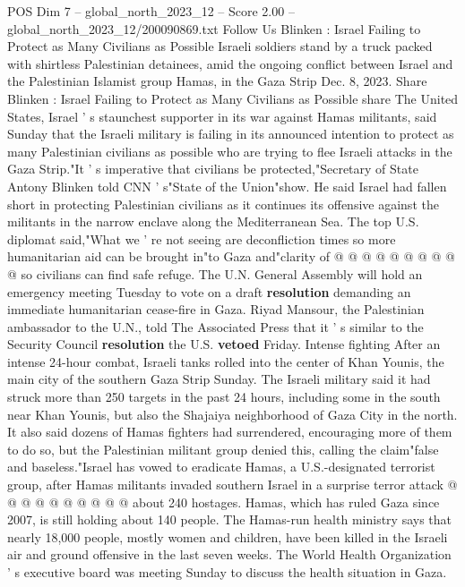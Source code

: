 \begin{textsample}{POS Dim 7 – global\_north\_2023\_12 – Score 2.00 – global\_north\_2023\_12/200090869.txt}  \label{ex:f7_pos_309}
Follow Us Blinken : Israel Failing to Protect as Many Civilians as Possible Israeli soldiers stand by a truck packed with shirtless Palestinian detainees, amid the ongoing conflict between Israel and the Palestinian Islamist group Hamas, in the Gaza Strip Dec. 8, 2023.
Share Blinken : Israel Failing to Protect as Many Civilians as Possible share The United States, Israel ' s staunchest supporter in its war against Hamas militants, said Sunday that the Israeli military is failing in its announced intention to protect as many Palestinian civilians as possible who are trying to flee Israeli attacks in the Gaza Strip."It ' s imperative that civilians be protected,"Secretary of State Antony Blinken told CNN ' s"State of the Union"show.
He said Israel had fallen short in protecting Palestinian civilians as it continues its offensive against the militants in the narrow enclave along the Mediterranean Sea.
The top U.S. diplomat said,"What we ' re not seeing are deconfliction times so more humanitarian aid can be brought in"to Gaza and"clarity of @ @ @ @ @ @ @ @ @ @ so civilians can find safe refuge.
The U.N.
General Assembly will hold an emergency meeting Tuesday to vote on a draft \textbf{resolution} demanding an immediate humanitarian cease-fire in Gaza.
Riyad Mansour, the Palestinian ambassador to the U.N., told The Associated Press that it ' s similar to the Security Council \textbf{resolution} the U.S. \textbf{vetoed} Friday.
Intense fighting After an intense 24-hour combat, Israeli tanks rolled into the center of Khan Younis, the main city of the southern Gaza Strip Sunday.
The Israeli military said it had struck more than 250 targets in the past 24 hours, including some in the south near Khan Younis, but also the Shajaiya neighborhood of Gaza City in the north.
It also said dozens of Hamas fighters had surrendered, encouraging more of them to do so, but the Palestinian militant group denied this, calling the claim"false and baseless."Israel has vowed to eradicate Hamas, a U.S.-designated terrorist group, after Hamas militants invaded southern Israel in a surprise terror attack @ @ @ @ @ @ @ @ @ @ about 240 hostages.
Hamas, which has ruled Gaza since 2007, is still holding about 140 people.
The Hamas-run health ministry says that nearly 18,000 people, mostly women and children, have been killed in the Israeli air and ground offensive in the last seven weeks.
The World Health Organization ' s executive board was meeting Sunday to discuss the health situation in Gaza.

\end{textsample}
